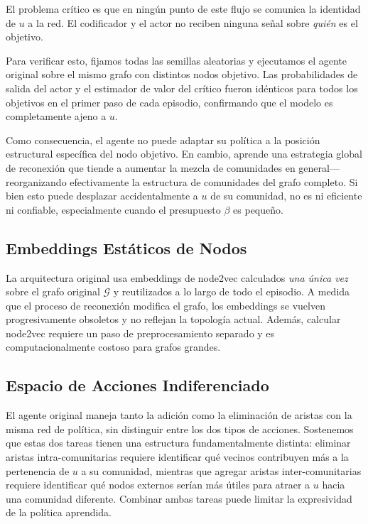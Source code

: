 \documentclass[11pt,a4paper,twoside]{tesis}
\newcommand{\G}{\mathcal{G}}
\begin{document}
El problema crítico es que en ningún punto de este flujo se comunica la identidad de $u$
a la red. El codificador y el actor no reciben ninguna señal sobre \emph{quién} es el
objetivo.

Para verificar esto, fijamos todas las semillas aleatorias y ejecutamos el agente
original sobre el mismo grafo con distintos nodos objetivo. Las probabilidades de salida
del actor y el estimador de valor del crítico fueron idénticos para todos los objetivos
en el primer paso de cada episodio, confirmando que el modelo es completamente ajeno a
$u$.

Como consecuencia, el agente no puede adaptar su política a la posición estructural
específica del nodo objetivo. En cambio, aprende una estrategia global de reconexión
que tiende a aumentar la mezcla de comunidades en general---reorganizando
efectivamente la estructura de comunidades del grafo completo. Si bien esto puede
desplazar accidentalmente a $u$ de su comunidad, no es ni eficiente ni confiable,
especialmente cuando el presupuesto $\beta$ es pequeño.

\subsection{Embeddings Estáticos de Nodos}

La arquitectura original usa embeddings de node2vec calculados \emph{una única vez}
sobre el grafo original $\G$ y reutilizados a lo largo de todo el episodio. A medida que
el proceso de reconexión modifica el grafo, los embeddings se vuelven progresivamente
obsoletos y no reflejan la topología actual. Además, calcular node2vec requiere un paso
de preprocesamiento separado y es computacionalmente costoso para grafos grandes.

\subsection{Espacio de Acciones Indiferenciado}

El agente original maneja tanto la adición como la eliminación de aristas con la misma
red de política, sin distinguir entre los dos tipos de acciones. Sostenemos que estas
dos tareas tienen una estructura fundamentalmente distinta: eliminar aristas
intra-comunitarias requiere identificar qué vecinos contribuyen más a la pertenencia de
$u$ a su comunidad, mientras que agregar aristas inter-comunitarias requiere identificar
qué nodos externos serían más útiles para atraer a $u$ hacia una comunidad diferente.
Combinar ambas tareas puede limitar la expresividad de la política aprendida.
\end{document}
